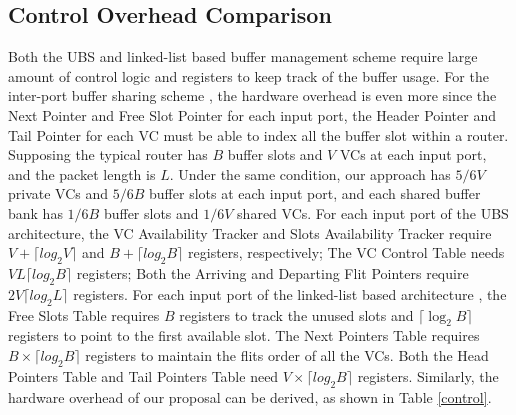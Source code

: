 \documentclass[10pt,conference]{IEEEtran}
\begin{document}
\subsection{Control Overhead Comparison}\label{controllogic}
Both the UBS \cite{NPKV06}\cite{5770788} and linked-list based \cite{4555894}\cite{Neishaburi:2009:RAN:1531542.1531658} buffer management scheme require large amount of control logic and registers to keep track of the buffer usage. For the inter-port buffer sharing scheme \cite{Neishaburi:2009:RAN:1531542.1531658}, the hardware overhead is even more since the Next Pointer and Free Slot Pointer for each input port, the Header Pointer and Tail Pointer for each VC must be able to index all the buffer slot within a router. Supposing the typical router \cite{NPKV06}\cite{5770788}\cite{4555894}\cite{Neishaburi:2009:RAN:1531542.1531658} has $B$ buffer slots and $V$ VCs at each input port, and the packet length is $L$. Under the same condition, our approach has $5/6V$ private VCs and $5/6B$ buffer slots at each input port, and each shared buffer bank has $1/6B$ buffer slots and $1/6V$ shared VCs. For each input port of the UBS architecture, the VC Availability Tracker and Slots Availability Tracker require $V+\lceil log_2 V\rceil$ and $B+\lceil log_2B\rceil$ registers, respectively; The VC Control Table needs $VL\lceil log_2B\rceil$ registers; Both the Arriving and Departing Flit Pointers require $2V\lceil log_2 L\rceil$ registers. For each input port of the linked-list based architecture \cite{4555894}, the Free Slots Table requires $B$ registers to track the unused slots and $\lceil \log_2 B\rceil$ registers to point to the first available slot. The Next Pointers Table requires $B\times \lceil log_2 B\rceil$ registers to maintain the flits order of all the VCs. Both the Head Pointers Table and Tail Pointers Table need $V\times \lceil log_2 B\rceil$ registers. Similarly, the hardware overhead of our proposal can be derived, as shown in Table \ref{control}.

\end{document}
